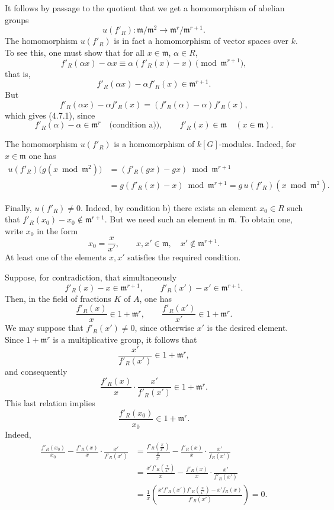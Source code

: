 \documentclass[11pt]{article}
\providecommand{\fm}{\mathfrak{m}}
\providecommand{\fm}{\mathfrak m}
\begin{document}
It follows by passage to the quotient that we get a homomorphism of abelian groups
\[
u(f'_R):\fm/\fm^2\longrightarrow \fm^r/\fm^{r+1}.
\]
The homomorphism $u(f'_R)$ is in fact a homomorphism of vector spaces over $k$. To see this, one must show that for all $x\in\fm$, $\alpha\in R$,
\[
f'_R(\alpha x)-\alpha x\equiv \alpha(f'_R(x)-x)\pmod{\fm^{r+1}},
\]
that is,
\begin{equation}
\tag{4.7.1}
f'_R(\alpha x)-\alpha f'_R(x)\in\fm^{r+1}.
\end{equation}
But
\[
f'_R(\alpha x)-\alpha f'_R(x)=(f'_R(\alpha)-\alpha)f'_R(x),
\]
which gives (4.7.1), since
\[
f'_R(\alpha)-\alpha\in\fm^r\quad\text{(condition a))},
\qquad
f'_R(x)\in\fm\quad(x\in\fm).
\]

The homomorphism $u(f'_R)$ is a homomorphism of $k[G]$-modules. Indeed,
for $x\in\fm$ one has
\[
\begin{aligned}
u(f'_R)\bigl(g(x\bmod\fm^2)\bigr)
&=(f'_R(gx)-gx)\bmod\fm^{r+1}\\
&=g(f'_R(x)-x)\bmod\fm^{r+1}
=g\,u(f'_R)(x\bmod\fm^2).
\end{aligned}
\]

Finally, $u(f'_R)\ne0$. Indeed, by condition b) there exists an element
$x_0\in R$ such that $f'_R(x_0)-x_0\notin\fm^{r+1}$. But we need such an
element in $\fm$. To obtain one, write $x_0$ in the form
\[
x_0=\frac{x}{x'},\qquad x,x'\in\fm,\quad x'\notin\fm^{r+1}.
\]
At least one of the elements $x,x'$ satisfies the required condition.

Suppose, for contradiction, that simultaneously
\[
f'_R(x)-x\in\fm^{r+1},
\qquad
f'_R(x')-x'\in\fm^{r+1}.
\]
Then, in the field of fractions $K$ of $A$, one has
\[
\frac{f'_R(x)}{x}\in1+\fm^r,
\qquad
\frac{f'_R(x')}{x'}\in1+\fm^r.
\]
We may suppose that $f'_R(x')\ne0$, since otherwise $x'$ is the desired
element. Since $1+\fm^r$ is a multiplicative group, it follows that
\[
\frac{x'}{f'_R(x')}\in1+\fm^r,
\]
and consequently
\[
\frac{f'_R(x)}{x}\cdot\frac{x'}{f'_R(x')}\in1+\fm^r.
\]
This last relation implies
\[
\frac{f'_R(x_0)}{x_0}\in1+\fm^r.
\]
Indeed,
\[
\begin{aligned}
\frac{f'_R(x_0)}{x_0}
-\frac{f'_R(x)}{x}\cdot\frac{x'}{f'_R(x')}
&=\frac{f'_R(\frac{x}{x'})}{\frac{x}{x'}}
-\frac{f'_R(x)}{x}\cdot\frac{x'}{f_R(x')}\\
&=\frac{x'f'_R(\frac{x}{x'})}{x}
-\frac{f'_R(x)}{x}\cdot\frac{x'}{f'_R(x')}\\
&=\frac1x\left(
\frac{x'f'_R(x')f'_R(\frac{x}{x'})-x'f_R(x)}
{f'_R(x')}\right)=0.
\end{aligned}
\]
\end{document}
